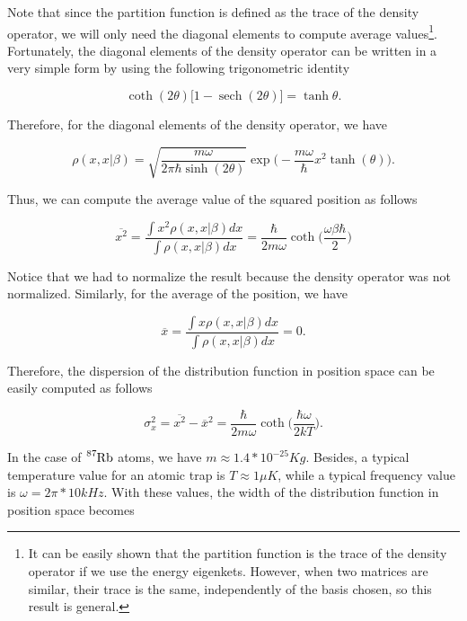 \documentclass{article}
\DeclareMathOperator{\sech}{sech}
\begin{document}
Note that since the partition function is defined as the trace of the density operator, we will only need the diagonal elements to compute average values\footnote{It can be easily shown that the partition function is the trace of the density operator if we use the energy eigenkets. However, when two matrices are similar, their trace is the same, independently of the basis chosen, so this result is general.}. Fortunately, the diagonal elements of the density operator can be written in a very simple form by using the following trigonometric identity

\begin{equation}
    \coth (2\theta) \big[1-\sech(2\theta) \big] = \tanh\theta.
\end{equation}

Therefore, for the diagonal elements of the density operator, we have 

\begin{equation}
    \rho(x,x|\beta) = \sqrt{\frac{m\omega}{2\pi\hbar\sinh(2\theta)}} \exp \bigg( -\frac{m\omega}{\hbar}x^{2} \tanh(\theta) \bigg).
\end{equation}

Thus, we can compute the average value of the squared position as follows

\begin{equation}
    \overline{x^{2}} = \frac{\int x^{2} \rho(x,x|\beta) dx}{\int \rho(x,x|\beta) dx} = \frac{\hbar}{2m\omega} \coth\bigg( \frac{\omega\beta\hbar}{2} \bigg)
\end{equation}

Notice that we had to normalize the result because the density operator was not normalized. Similarly, for the average of the position, we have

\begin{equation}
    \overline{x} = \frac{\int x \rho(x,x|\beta) dx}{\int \rho(x,x|\beta) dx} = 0.
\end{equation}

Therefore, the dispersion of the distribution function in position space can be easily computed as follows

\begin{equation}\label{dispersion_harmonic_oscillator}
    \sigma_{x}^{2} = \overline{x^{2}} - \overline{x}^{2} = \frac{\hbar}{2m\omega} \coth \bigg( \frac{\hbar\omega}{2kT} \bigg).
\end{equation}

In the case of $\ce{^{87}_{}Rb}$ atoms, we have $m\approx1.4*10^{-25} Kg$. Besides, a typical temperature value for an atomic trap is $T\approx 1 \mu K$, while a typical frequency value is $\omega = 2\pi *10 kHz$. With these values, the width of the distribution function in position space becomes
\end{document}
